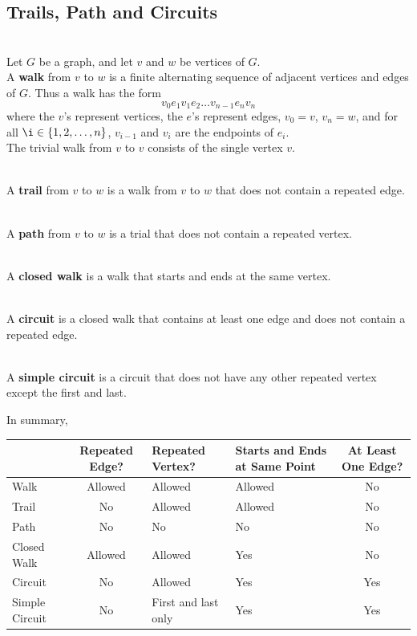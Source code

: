 \documentclass[12pt]{article}
\begin{document}
\subsection{Trails, Path and Circuits}
\begin{definition}[Walk]
\hfill\\
\normalfont Let $G$ be a graph, and let $v$ and $w$ be vertices of $G$.\\
A \textbf{walk} from $v$ to $w$ is a finite alternating sequence of adjacent vertices and edges of $G$. Thus a walk has the form
\[
v_0e_1v_1e_2\ldots v_{n-1}e_nv_n
\]
where the $v$'s represent vertices, the $e$'s represent edges, $v_0 = v$, $v_n = w$, and for all $\i\in \{1,2,\ldots,n\}$, $v_{i-1}$ and $v_{i}$ are the endpoints of $e_i$.\\
The trivial walk from $v$ to $v$ consists of the single vertex $v$.
\end{definition}
\begin{definition}[Trail]
\hfill\\
\normalfont A \textbf{trail} from $v$ to $w$ is a walk from $v$ to $w$ that does not contain a repeated edge.
\end{definition}
\begin{definition}[Path]
\hfill\\
\normalfont A \textbf{path} from $v$ to $w$ is a trial that does not contain a repeated vertex.
\end{definition}
\begin{definition}
\hfill\\
\normalfont A \textbf{closed walk} is a walk that starts and ends at the same vertex.
\end{definition}
\begin{definition}[Circuit]
\hfill\\
\normalfont A \textbf{circuit} is a closed walk that contains at least one edge and does not contain a repeated edge.
\end{definition}
\begin{definition}
\hfill\\
\normalfont A \textbf{simple circuit} is a circuit that does not have any other repeated vertex except the first and last.
\end{definition}
\clearpage
In summary,
\begin{table}[h]
\centering
\begin{tabularx}{\textwidth}{|l|c|Y|Y|c|}
\hline
&Repeated Edge?&Repeated Vertex?& Starts and Ends at Same Point&At Least One Edge?\\\hline
Walk&Allowed&Allowed&Allowed&No\\\hline
Trail&No&Allowed&Allowed&No\\\hline
Path&No&No&No&No\\\hline
Closed Walk &Allowed &Allowed &Yes &No\\\hline
Circuit &No &Allowed&Yes&Yes\\\hline
Simple Circuit &No&First and last only&Yes&Yes\\\hline
\end{tabularx}
\end{table}
\end{document}

